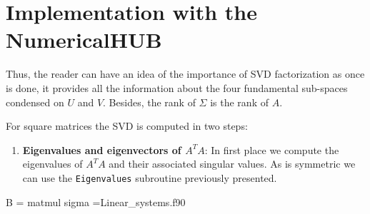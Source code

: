 %   
%   
   
 \section{Implementation with the NumericalHUB } 
   Thus, the reader can have an idea of the importance of SVD factorization as once is done, it provides all the information about the four fundamental sub-spaces condensed on $U$ and $V$. Besides, the rank of $\Sigma$ is the rank of $A$. 
   
   For square matrices the SVD is computed in two steps:
   
   \begin{enumerate}
   	     \item \textbf{Eigenvalues and eigenvectors of $A^TA$}: In first place we compute the eigenvalues of $A^TA$ and their associated singular values. As is symmetric we can use the \verb|Eigenvalues| subroutine previously presented.
   \end{enumerate} 
    \vspace{0.5cm} 
    {B = matmul}
    {sigma =}{Linear_systems.f90}
    
